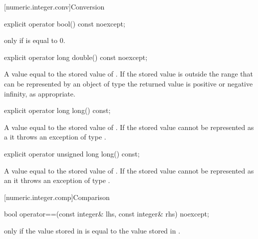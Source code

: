 \begin{addedblock}
[numeric.integer.conv]{Conversion}

\begin{itemdecl}
explicit operator bool() const noexcept;
\end{itemdecl}

\begin{itemdescr}
\returns {} only if  is equal to 0.
\end{itemdescr}

\begin{itemdecl}
explicit operator long double() const noexcept;
\end{itemdecl}

\begin{itemdescr}
\returns A value equal to the stored value of  . If the stored value is outside the range that can be represented by an object of type   the returned value is positive or negative infinity, as appropriate.
\end{itemdescr}

\begin{itemdecl}
explicit operator long long() const;
\end{itemdecl}

\begin{itemdescr}
\returns A value equal to the stored value of . If the stored value cannot be represented as a  it throws an exception of type .
\end{itemdescr}

\begin{itemdecl}
explicit operator unsigned long long() const;
\end{itemdecl}

\begin{itemdescr}
\returns A value equal to the stored value of . If the stored value cannot be represented as an  it throws an exception of type .
\end{itemdescr}

[numeric.integer.comp]{Comparison}

\begin{itemdecl}
bool operator==(const integer& lhs, const integer& rhs) noexcept;
\end{itemdecl}

\begin{itemdescr}
\returns {} only if the value stored in  is equal to the value stored in .
\end{itemdescr}


\end{addedblock}
